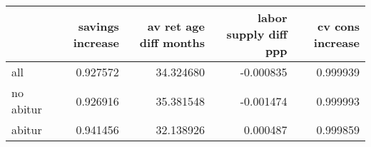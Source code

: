 \begin{tabular}{lrrrr}
\toprule
 & savings increase & av ret age diff months & labor supply diff ppp & cv cons increase \\
\midrule
all & 0.927572 & 34.324680 & -0.000835 & 0.999939 \\
no abitur & 0.926916 & 35.381548 & -0.001474 & 0.999993 \\
abitur & 0.941456 & 32.138926 & 0.000487 & 0.999859 \\
\bottomrule
\end{tabular}
